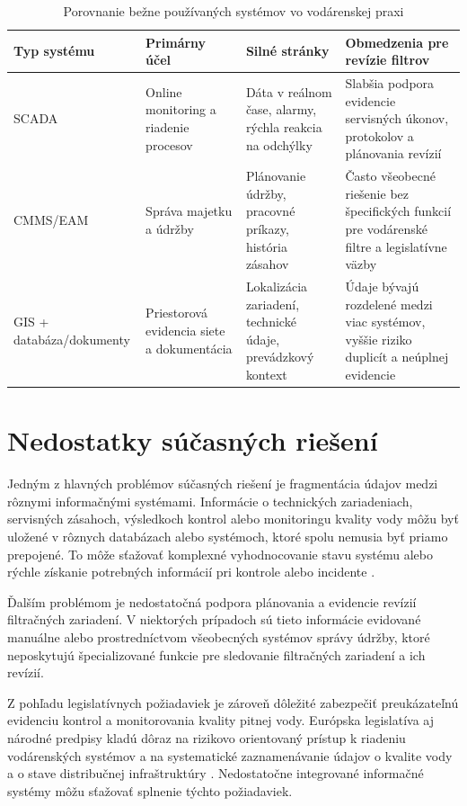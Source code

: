 \begin{table}[htbp]
\centering
\caption{Porovnanie bežne používaných systémov vo vodárenskej praxi}
\label{tab:system-comparison}
\small
\begin{tabular}{p{3cm} p{3.2cm} p{3.2cm} p{4.4cm}}
\toprule
Typ systému & Primárny účel & Silné stránky & Obmedzenia pre revízie filtrov \\
\midrule
SCADA & Online monitoring a riadenie procesov & Dáta v reálnom čase, alarmy, rýchla reakcia na odchýlky & Slabšia podpora evidencie servisných úkonov, protokolov a plánovania revízií \\
CMMS/EAM & Správa majetku a údržby & Plánovanie údržby, pracovné príkazy, história zásahov & Často všeobecné riešenie bez špecifických funkcií pre vodárenské filtre a legislatívne väzby \\
GIS + databáza/dokumenty & Priestorová evidencia siete a dokumentácia & Lokalizácia zariadení, technické údaje, prevádzkový kontext & Údaje bývajú rozdelené medzi viac systémov, vyššie riziko duplicít a neúplnej evidencie \\
\bottomrule
\end{tabular}
\end{table}

\section{Nedostatky súčasných riešení}

Jedným z hlavných problémov súčasných riešení je fragmentácia údajov medzi rôznymi informačnými systémami. Informácie o technických zariadeniach, servisných zásahoch, výsledkoch kontrol alebo monitoringu kvality vody môžu byť uložené v rôznych databázach alebo systémoch, ktoré spolu nemusia byť priamo prepojené. To môže sťažovať komplexné vyhodnocovanie stavu systému alebo rýchle získanie potrebných informácií pri kontrole alebo incidente \cite{CarricoFerreira2021}.

Ďalším problémom je nedostatočná podpora plánovania a evidencie revízií filtračných zariadení. V niektorých prípadoch sú tieto informácie evidované manuálne alebo prostredníctvom všeobecných systémov správy údržby, ktoré neposkytujú špecializované funkcie pre sledovanie filtračných zariadení a ich revízií.

Z pohľadu legislatívnych požiadaviek je zároveň dôležité zabezpečiť preukázateľnú evidenciu kontrol a monitorovania kvality pitnej vody. Európska legislatíva aj národné predpisy kladú dôraz na rizikovo orientovaný prístup k riadeniu vodárenských systémov a na systematické zaznamenávanie údajov o kvalite vody a o stave distribučnej infraštruktúry \cite{EUDWD2020,SKVyhlaska912023}. Nedostatočne integrované informačné systémy môžu sťažovať splnenie týchto požiadaviek.
